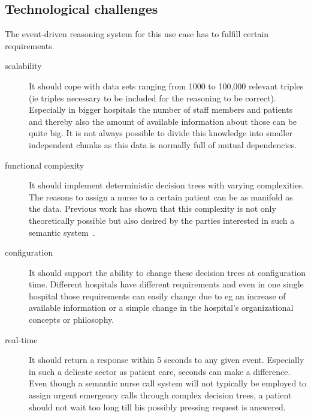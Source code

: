 \subsection{Technological challenges}
The event-driven reasoning system for this use case has to fulfill certain requirements.
\begin{description}
\item[scalability] It should cope with data sets ranging from 1000 to 100,000 relevant triples (ie triples necessary to be included for the reasoning to be correct). 
Especially in bigger hospitals the number of staff members and patients and thereby also the amount of available information about those can be quite big. 
It is not always possible to divide this knowledge into smaller independent chunks as this data is normally full of mutual dependencies. 
\item[functional complexity] It should implement deterministic decision trees with varying complexities. The reasons to assign a nurse to 
a certain patient can be as manifold as the data. Previous work has shown that this complexity is not only theoretically possible but also desired by the 
parties interested in such a semantic system~\cite{accioontold}.
\item[configuration] It should support the ability to change these decision trees at configuration time. Different hospitals have different 
requirements and even in one single hospital those requirements 
can easily change due to eg an increase of available information or a simple change in the hospital's organizational concepts or philosophy.
\item[real-time] It should return a response within 5 seconds to any given event. Especially in such a delicate sector as patient care, seconds can make a difference. 
Even though a semantic nurse call system will not typically be employed to assign urgent emergency calls  through complex decision trees, 
a patient should not wait too long till his possibly pressing request is answered.
\end{description}
